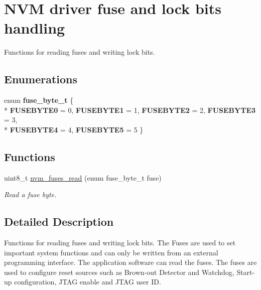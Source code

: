 \hypertarget{group__nvm__fuse__lock__group}{\section{N\-V\-M driver fuse and lock bits handling}
\label{group__nvm__fuse__lock__group}
}


Functions for reading fuses and writing lock bits.  


\subsection*{Enumerations}
\begin{DoxyCompactItemize}
\item 
enum {\bfseries fuse\-\_\-byte\-\_\-t} \{ \\*
{\bfseries F\-U\-S\-E\-B\-Y\-T\-E0} =  0, 
{\bfseries F\-U\-S\-E\-B\-Y\-T\-E1} =  1, 
{\bfseries F\-U\-S\-E\-B\-Y\-T\-E2} =  2, 
{\bfseries F\-U\-S\-E\-B\-Y\-T\-E3} =  3, 
\\*
{\bfseries F\-U\-S\-E\-B\-Y\-T\-E4} =  4, 
{\bfseries F\-U\-S\-E\-B\-Y\-T\-E5} =  5
 \}
\end{DoxyCompactItemize}
\subsection*{Functions}
\begin{DoxyCompactItemize}
\item 
uint8\-\_\-t \hyperlink{group__nvm__fuse__lock__group_ga7f38ae8b811b4b6c7a209e37cfe1b03d}{nvm\-\_\-fuses\-\_\-read} (enum fuse\-\_\-byte\-\_\-t fuse)
\begin{DoxyCompactList}\small\item\em Read a fuse byte. \end{DoxyCompactList}\end{DoxyCompactItemize}


\subsection{Detailed Description}
Functions for reading fuses and writing lock bits. The Fuses are used to set important system functions and can only be written from an external programming interface. The application software can read the fuses. The fuses are used to configure reset sources such as Brown-\/out Detector and Watchdog, Start-\/up configuration, J\-T\-A\-G enable and J\-T\-A\-G user I\-D.

